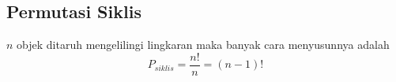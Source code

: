 \subsection{Permutasi Siklis}
$n$ objek ditaruh mengelilingi lingkaran maka banyak cara menyusunnya adalah
$$P_{siklis} =\dfrac{n!}{n} = (n-1)!$$